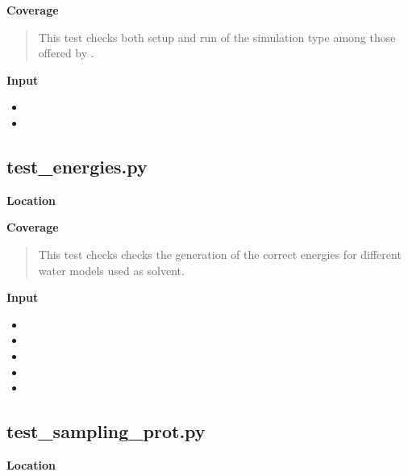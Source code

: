 \documentclass[letterpaper,10pt,english]{sphinxmanual}
\begin{document}
\textbf{Coverage}
\begin{quote}

This test checks both setup and run of the  simulation type among those offered by .
\end{quote}

\textbf{Input}
\begin{itemize}
\item {} 

\item {} 

\end{itemize}


\subsection{test\_energies.py}
\label{testsuite:test-energies-py}
\textbf{Location}
\begin{quote}

\end{quote}

\textbf{Coverage}
\begin{quote}

This test checks checks the generation of the correct energies for different water models used as solvent.
\end{quote}

\textbf{Input}
\begin{itemize}
\item {} 

\item {} 

\item {} 

\item {} 

\item {} 

\end{itemize}


\subsection{test\_sampling\_prot.py}
\label{testsuite:test-sampling-prot-py}
\textbf{Location}
\begin{quote}

\end{quote}
\end{document}
